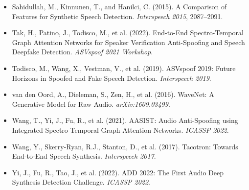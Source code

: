 \documentclass[12pt,a4paper]{article}
\begin{document}
\begin{itemize}[leftmargin=2em, itemsep=5pt]
  \item Sahidullah, M., Kinnunen, T., and Hanilci, C. (2015). A Comparison of Features
    for Synthetic Speech Detection.
    \textit{Interspeech 2015}, 2087--2091.

  \item Tak, H., Patino, J., Todisco, M., et al. (2022). End-to-End Spectro-Temporal
    Graph Attention Networks for Speaker Verification Anti-Spoofing and Speech Deepfake
    Detection. \textit{ASVspoof 2021 Workshop}.

  \item Todisco, M., Wang, X., Vestman, V., et al. (2019). ASVspoof 2019: Future
    Horizons in Spoofed and Fake Speech Detection. \textit{Interspeech 2019}.

  \item van den Oord, A., Dieleman, S., Zen, H., et al. (2016). WaveNet: A Generative
    Model for Raw Audio. \textit{arXiv:1609.03499}.

  \item Wang, T., Yi, J., Fu, R., et al. (2021). AASIST: Audio Anti-Spoofing using
    Integrated Spectro-Temporal Graph Attention Networks. \textit{ICASSP 2022}.

  \item Wang, Y., Skerry-Ryan, R.J., Stanton, D., et al. (2017). Tacotron: Towards
    End-to-End Speech Synthesis. \textit{Interspeech 2017}.

  \item Yi, J., Fu, R., Tao, J., et al. (2022). ADD 2022: The First Audio Deep
    Synthesis Detection Challenge. \textit{ICASSP 2022}.
\end{itemize}
\end{document}
